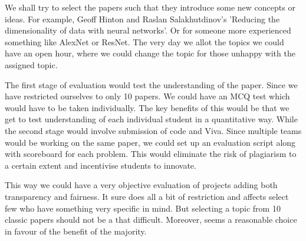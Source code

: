 \documentclass{article} %
\begin{document}
We shall try to select the papers such that they introduce some
new concepts or ideas. For example, Geoff Hinton and Raslan Salakhutdinov's
'Reducing the dimensionality of data with neural networks'. Or for someone
more experienced something like AlexNet or ResNet. The very day
we allot the topics we could have an open hour, where we could
change the topic for those unhappy with the assigned topic.

The first stage of evaluation would test the understanding of the
paper. Since we have restricted ourselves to only 10 papers. We
could have an MCQ test which would have to be taken individually.
The key benefits of this would be that we get to test understanding of
each individual student in a quantitative way. While the second
stage would involve submission of code and Viva. Since multiple
teams would be working on the same paper, we could set up an
evaluation script along with scoreboard for each problem. This
would eliminate the risk of plagiarism to a certain extent and
incentivise students to innovate.

This way we could have a very objective evaluation of projects
adding both transparency and fairness. It sure does all a
bit of restriction and affects select few who have something
very specific in mind. But selecting a topic from 10 classic
papers should not be a that difficult. Moreover, seems a reasonable
choice in favour of the benefit of the majority.

% 
% 
\end{document}
